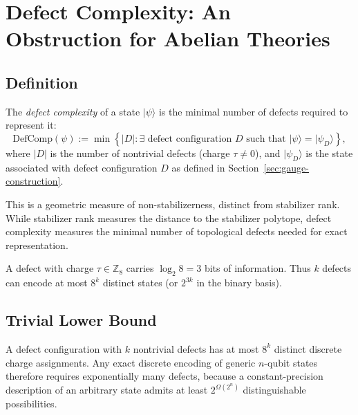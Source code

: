 \section{Defect Complexity: An Obstruction for Abelian Theories}

\subsection{Definition}

\begin{definition}
The \textit{defect complexity} of a state $|\psi\rangle$ is the minimal number of defects required to represent it:
\begin{equation}
\text{DefComp}(\psi) := \min \left\{ |D| : \exists \text{ defect configuration } D \text{ such that } |\psi\rangle = |\psi_D\rangle \right\},
\end{equation}
where $|D|$ is the number of nontrivial defects (charge $\tau \neq 0$), and $|\psi_D\rangle$ is the state associated with defect configuration $D$ as defined in Section~\ref{sec:gauge-construction}.
\end{definition}

This is a geometric measure of non-stabilizerness, distinct from stabilizer rank. While stabilizer rank measures the distance to the stabilizer polytope, defect complexity measures the minimal number of topological defects needed for exact representation.

\begin{remark}
A defect with charge $\tau \in \mathbb{Z}_8$ carries $\log_2 8 = 3$ bits of information. Thus $k$ defects can encode at most $8^k$ distinct states (or $2^{3k}$ in the binary basis).
\end{remark}

\subsection{Trivial Lower Bound}

\begin{proposition}
A defect configuration with $k$ nontrivial defects has at most $8^k$ distinct discrete charge assignments. Any exact discrete encoding of generic $n$-qubit states therefore requires exponentially many defects, because a constant-precision description of an arbitrary state admits at least $2^{\Omega(2^n)}$ distinguishable possibilities.
\end{proposition}

